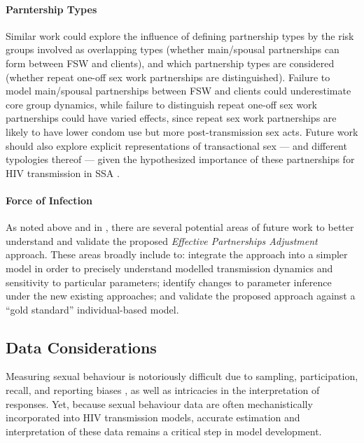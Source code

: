 \paragraph{Parntership Types}
Similar work could explore the influence of defining partnership types
by the risk groups involved \vs as overlapping types
(\eg whether main/spousal partnerships can form between FSW and clients),
and which partnership types are considered
(\eg whether repeat \vs one-off sex work partnerships are distinguished).
Failure to model main/spousal partnerships between FSW and clients
could underestimate core group dynamics, while
failure to distinguish repeat \vs one-off sex work partnerships could have varied effects,
since repeat sex work partnerships are likely to have
lower condom use but more post-transmission sex acts.
Future work should also explore explicit representations of transactional sex
--- and different typologies thereof \cite{Fielding-Miller2016} ---
given the hypothesized importance of these partnerships
for HIV transmission in SSA \cite{Wamoyi2016}.
\paragraph{Force of Infection}
As noted above and in ,
there are several potential areas of future work to better understand and validate
the proposed \emph{Effective Partnerships Adjustment} approach.
These areas broadly include to:
integrate the approach into a simpler model in order to precisely understand
modelled transmission dynamics and sensitivity to particular parameters;
identify changes to parameter inference under the new \vs existing approaches; and
validate the proposed approach against a ``gold standard'' individual-based model.
\subsection{Data Considerations}\label{conc.future.data}
Measuring sexual behaviour is notoriously difficult due to
sampling, participation, recall, and reporting biases \cite{Fenton2001},
as well as intricacies in the interpretation of responses.
Yet, because sexual behaviour data are often
mechanistically incorporated into HIV transmission models,
accurate estimation and interpretation of these data remains a critical step in model development.

